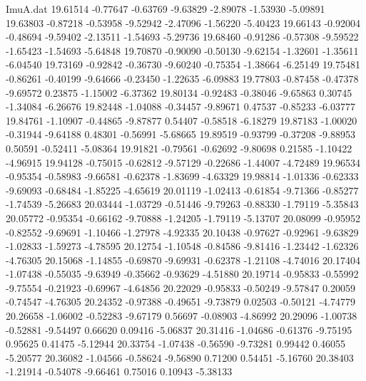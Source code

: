 \begin{filecontents}{ImuA.dat}
  19.61514   -0.77647   -0.63769   -9.63829   -2.89078   -1.53930   -5.09891
  19.63803   -0.87218   -0.53958   -9.52942   -2.47096   -1.56220   -5.40423
  19.66143   -0.92004   -0.48694   -9.59402   -2.13511   -1.54693   -5.29736
  19.68460   -0.91286   -0.57308   -9.59522   -1.65423   -1.54693   -5.64848
  19.70870   -0.90090   -0.50130   -9.62154   -1.32601   -1.35611   -6.04540
  19.73169   -0.92842   -0.36730   -9.60240   -0.75354   -1.38664   -6.25149
  19.75481   -0.86261   -0.40199   -9.64666   -0.23450   -1.22635   -6.09883
  19.77803   -0.87458   -0.47378   -9.69572    0.23875   -1.15002   -6.37362
  19.80134   -0.92483   -0.38046   -9.65863    0.30745   -1.34084   -6.26676
  19.82448   -1.04088   -0.34457   -9.89671    0.47537   -0.85233   -6.03777
  19.84761   -1.10907   -0.44865   -9.87877    0.54407   -0.58518   -6.18279
  19.87183   -1.00020   -0.31944   -9.64188    0.48301   -0.56991   -5.68665
  19.89519   -0.93799   -0.37208   -9.88953    0.50591   -0.52411   -5.08364
  19.91821   -0.79561   -0.62692   -9.80698    0.21585   -1.10422   -4.96915
  19.94128   -0.75015   -0.62812   -9.57129   -0.22686   -1.44007   -4.72489
  19.96534   -0.95354   -0.58983   -9.66581   -0.62378   -1.83699   -4.63329
  19.98814   -1.01336   -0.62333   -9.69093   -0.68484   -1.85225   -4.65619
  20.01119   -1.02413   -0.61854   -9.71366   -0.85277   -1.74539   -5.26683
  20.03444   -1.03729   -0.51446   -9.79263   -0.88330   -1.79119   -5.35843
  20.05772   -0.95354   -0.66162   -9.70888   -1.24205   -1.79119   -5.13707
  20.08099   -0.95952   -0.82552   -9.69691   -1.10466   -1.27978   -4.92335
  20.10438   -0.97627   -0.92961   -9.63829   -1.02833   -1.59273   -4.78595
  20.12754   -1.10548   -0.84586   -9.81416   -1.23442   -1.62326   -4.76305
  20.15068   -1.14855   -0.69870   -9.69931   -0.62378   -1.21108   -4.74016
  20.17404   -1.07438   -0.55035   -9.63949   -0.35662   -0.93629   -4.51880
  20.19714   -0.95833   -0.55992   -9.75554   -0.21923   -0.69967   -4.64856
  20.22029   -0.95833   -0.50249   -9.57847    0.20059   -0.74547   -4.76305
  20.24352   -0.97388   -0.49651   -9.73879    0.02503   -0.50121   -4.74779
  20.26658   -1.06002   -0.52283   -9.67179    0.56697   -0.08903   -4.86992
  20.29096   -1.00738   -0.52881   -9.54497    0.66620    0.09416   -5.06837
  20.31416   -1.04686   -0.61376   -9.75195    0.95625    0.41475   -5.12944
  20.33754   -1.07438   -0.56590   -9.73281    0.99442    0.46055   -5.20577
  20.36082   -1.04566   -0.58624   -9.56890    0.71200    0.54451   -5.16760
  20.38403   -1.21914   -0.54078   -9.66461    0.75016    0.10943   -5.38133

\end{filecontents}

